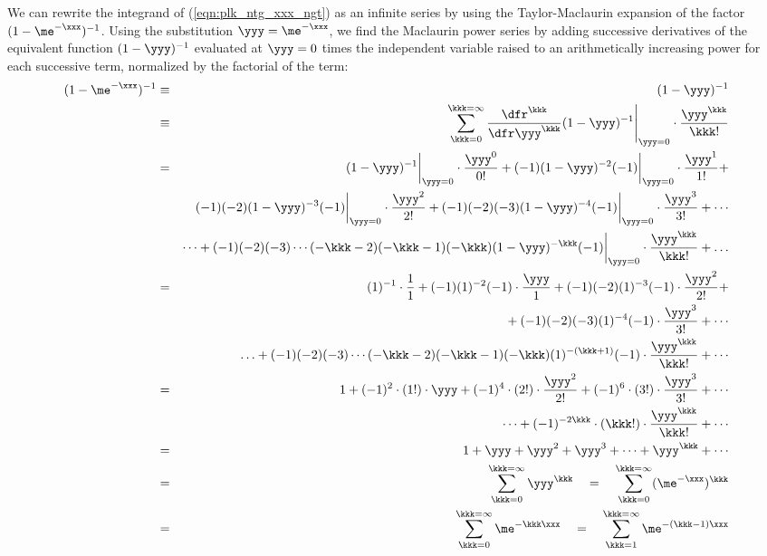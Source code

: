 \documentclass[12pt]{article}
\begin{document}
We can rewrite the integrand of (\ref{eqn:plk_ntg_xxx_ngt}) as an
infinite series by using the Taylor-Maclaurin expansion of the factor
$(1 - \me^{-\xxx})^{-1}$.
Using the substitution $\yyy = \me^{-\xxx}$, we find the Maclaurin
power series by adding successive derivatives of the equivalent
function $(1-\yyy)^{-1}$ evaluated at $\yyy = 0$ times the 
independent variable raised to an arithmetically increasing power 
for each successive term, normalized by the factorial of the term:
\begin{eqnarray}
  (1-\me^{-\xxx})^{-1} & \equiv & (1-\yyy)^{-1} \nonumber \\
  & \equiv & \left. \sum_{\kkk=0}^{\kkk=\infty}
  \frac{\dfr^{\kkk}}{\dfr \yyy^{\kkk}} (1 - \yyy)^{-1} \right|_{\yyy=0}
  \cdot \frac{\yyy^{\kkk}}{\kkk!} \nonumber \\
  & = & 
  (1 - \yyy)^{-1} \bigg|_{\yyy=0} \cdot \frac{\yyy^{0}}{0!} + 
  (-1)(1 - \yyy)^{-2}(-1) \bigg|_{\yyy=0} \cdot \frac{\yyy^{1}}{1!} + \nonumber \\
  & & 
  {} (-1)(-2)(1 - \yyy)^{-3}(-1) \bigg|_{\yyy=0} \cdot \frac{\yyy^{2}}{2!} + 
  (-1)(-2)(-3)(1 - \yyy)^{-4}(-1) \bigg|_{\yyy=0} \cdot \frac{\yyy^{3}}{3!} + \cdots \nonumber \\ 
  & & 
  \cdots + 
  (-1)(-2)(-3) \cdots (-\kkk - 2)(-\kkk - 1)(-\kkk) (1 - \yyy)^{-\kkk}(-1) \bigg|_{\yyy=0} \cdot \frac{\yyy^{\kkk}}{\kkk!} + \ldots \nonumber \\
  & = & 
  (1)^{-1} \cdot \frac{1}{1} + 
  (-1)(1)^{-2}(-1) \cdot \frac{\yyy}{1} + 
  (-1)(-2)(1)^{-3}(-1) \cdot \frac{\yyy^{2}}{2!} + \nonumber \\
  & & 
  {} + (-1)(-2)(-3)(1)^{-4}(-1) \cdot \frac{\yyy^{3}}{3!} + \cdots \nonumber \\
  & & 
  \ldots + (-1)(-2)(-3) \cdots (-\kkk - 2)(-\kkk - 1)(-\kkk) (1)^{-(\kkk+1)} (-1) \cdot \frac{\yyy^{\kkk}}{\kkk!} + \cdots
  \nonumber \\
  & = & 
  1 + 
  (-1)^{2} \cdot (1!) \cdot \yyy + 
  (-1)^{4} \cdot (2!) \cdot \frac{\yyy^{2}}{2!} + 
  (-1)^{6} \cdot (3!) \cdot \frac{\yyy^{3}}{3!} + \cdots \nonumber \\
  & & 
  \cdots + (-1)^{-2\kkk} \cdot (\kkk!) \cdot \frac{\yyy^{\kkk}}{\kkk!} + \cdots \nonumber \\
  & = & 
  1 + \yyy + \yyy^{2} + \yyy^{3} + \cdots + \yyy^{\kkk} + \cdots \nonumber \\
  & = & 
  \sum_{\kkk=0}^{\kkk=\infty} \yyy^{\kkk} \quad = \quad \sum_{\kkk=0}^{\kkk=\infty} (\me^{-\xxx})^{\kkk} \nonumber \\  
  & = & 
  \sum_{\kkk=0}^{\kkk=\infty} \me^{-\kkk\xxx} \quad = \quad \sum_{\kkk=1}^{\kkk=\infty} \me^{-(\kkk - 1)\xxx}
\label{eqn:tyl_mcl_srs}
\end{eqnarray}
\end{document}
